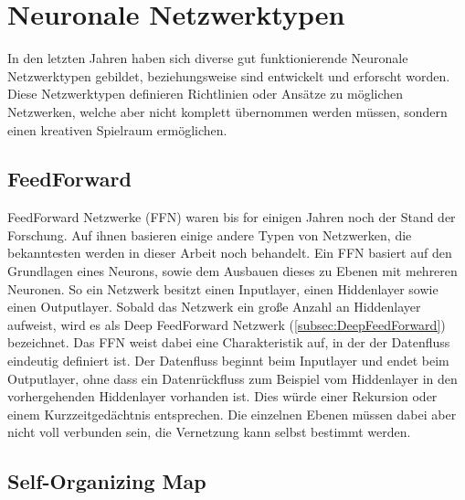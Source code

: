 
\section{Neuronale Netzwerktypen}

In den letzten Jahren haben sich diverse gut funktionierende Neuronale Netzwerktypen gebildet, beziehungsweise sind entwickelt und erforscht worden. 
Diese Netzwerktypen definieren Richtlinien oder Ansätze zu möglichen Netzwerken, welche aber nicht komplett übernommen werden müssen, sondern einen kreativen Spielraum ermöglichen. \\


\subsection{FeedForward}
\label{subsec:FeedForward}

FeedForward Netzwerke (FFN) waren bis for einigen Jahren noch der Stand der Forschung.
Auf ihnen basieren einige andere Typen von Netzwerken, die bekanntesten werden in dieser Arbeit noch behandelt.
Ein FFN basiert auf den Grundlagen eines Neurons, sowie dem Ausbauen dieses zu Ebenen mit mehreren Neuronen.
So ein Netzwerk besitzt einen Inputlayer, einen Hiddenlayer sowie einen Outputlayer.
Sobald das Netzwerk ein große Anzahl an Hiddenlayer aufweist, wird es als Deep FeedForward Netzwerk (\ref{subsec:DeepFeedForward}) bezeichnet.
Das FFN weist dabei eine Charakteristik auf, in der der Datenfluss eindeutig definiert ist. 
Der Datenfluss beginnt beim Inputlayer und endet beim Outputlayer, ohne dass ein Datenrückfluss zum Beispiel vom Hiddenlayer in den vorhergehenden Hiddenlayer vorhanden ist.
Dies würde einer Rekursion oder einem Kurzzeitgedächtnis entsprechen.
Die einzelnen Ebenen müssen dabei aber nicht voll verbunden sein, die Vernetzung kann selbst bestimmt werden.

\subsection{Self-Organizing Map}
\label{subsec:SelfOrganizingMap}

